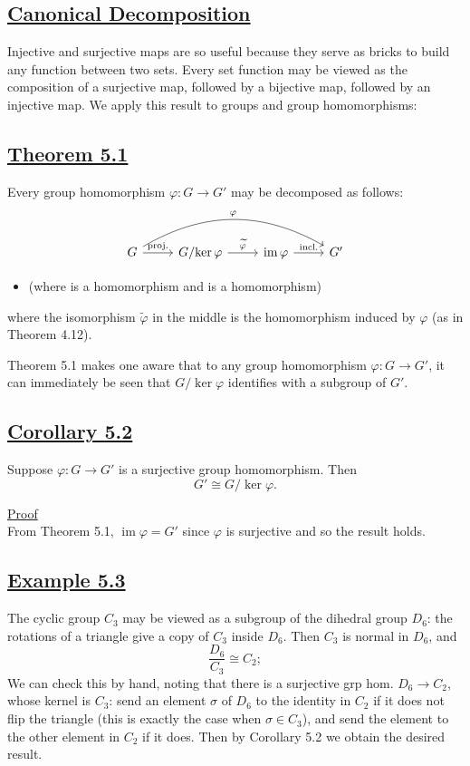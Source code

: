 \subsection*{\underline{Canonical Decomposition}}
Injective and surjective maps are so useful because they serve as bricks to build any function between two sets. Every set function may be viewed as the composition of a surjective map, followed by a bijective map, followed by an injective map. We apply this result to groups and group homomorphisms:

\subsection*{\underline{Theorem 5.1}}
Every group homomorphism $\varphi : G \longrightarrow G'$ may be decomposed as follows:
\[
\begin{tikzcd}
G \arrow[rrr, "\varphi", bend left=30] \arrow[r, "\text{proj.}"] & G/{\ker\varphi} \arrow[r, "\widetilde{\varphi}"] & \operatorname{im}\varphi \arrow[r, "\text{incl.}"] & G'
\end{tikzcd}
\]
\begin{itemize}
    \item[] \footnotesize \hfill (where  is a homomorphism and  is a homomorphism)
\end{itemize}

\noindent where the isomorphism $\widetilde{\varphi}$ in the middle is the homomorphism induced by $\varphi$ (as in Theorem 4.12).\color{black}

Theorem 5.1 makes one aware that to any group homomorphism $\varphi : G \longrightarrow G'$, it can immediately be seen that $G/{\ker\varphi}$ identifies with a subgroup of $G'$.

\subsection*{\underline{Corollary 5.2}}
Suppose $\varphi : G \longrightarrow G'$ is a surjective group homomorphism. Then
$$G' \cong G/{\ker\varphi}.$$

\noindent\underline{Proof} \\
From Theorem 5.1, $\operatorname{im}\varphi = G'$ since $\varphi$ is surjective and so the result holds.

\subsection*{\underline{Example 5.3}}
The cyclic group $C_3$ may be viewed as a subgroup of the dihedral group $D_6$: the rotations of a triangle give a copy of $C_3$ inside $D_6$. Then $C_3$ is normal in $D_6$, and
$$\frac{D_6}{C_3} \cong C_2;$$
We can check this by hand, noting that there is a surjective grp hom. $D_6 \longrightarrow C_2$, whose kernel is $C_3$: send an element $\sigma$ of $D_6$ to the identity in $C_2$ if it does not flip the triangle (this is exactly the case when $\sigma \in C_3$), and send the element to the other element in $C_2$ if it does. Then by Corollary 5.2 we obtain the desired result.

